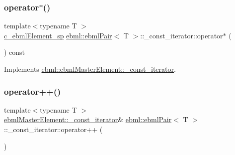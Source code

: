 \mbox{\label{classebml_1_1ebmlPair_1_1__const__iterator_ad5d24ee7d47113fbde6e2dc895b5b80a}} 
\subsubsection{\texorpdfstring{operator$\ast$()}{operator*()}}
{\footnotesize\ttfamily template$<$typename T $>$ \\
\mbox{\hyperlink{namespaceebml_a2deef4e8071531b32e3533f1bf978917}{c\+\_\+ebml\+Element\+\_\+sp}} \mbox{\hyperlink{classebml_1_1ebmlPair}{ebml\+::ebml\+Pair}}$<$ T $>$\+::\+\_\+const\+\_\+iterator\+::operator$\ast$ (\begin{DoxyParamCaption}{ }\end{DoxyParamCaption}) const\hspace{0.3cm}{\ttfamily [virtual]}}



Implements \mbox{\hyperlink{classebml_1_1ebmlMasterElement_1_1__const__iterator_aa3e5459826695a9043745fbbaea9cd47}{ebml\+::ebml\+Master\+Element\+::\+\_\+const\+\_\+iterator}}.

\mbox{\label{classebml_1_1ebmlPair_1_1__const__iterator_a504a93a5fa6b77f8604016c50957ef0c}} 
\subsubsection{\texorpdfstring{operator++()}{operator++()}}
{\footnotesize\ttfamily template$<$typename T $>$ \\
\mbox{\hyperlink{classebml_1_1ebmlMasterElement_1_1__const__iterator}{ebml\+Master\+Element\+::\+\_\+const\+\_\+iterator}}\& \mbox{\hyperlink{classebml_1_1ebmlPair}{ebml\+::ebml\+Pair}}$<$ T $>$\+::\+\_\+const\+\_\+iterator\+::operator++ (\begin{DoxyParamCaption}{ }\end{DoxyParamCaption})\hspace{0.3cm}{\ttfamily [virtual]}}



